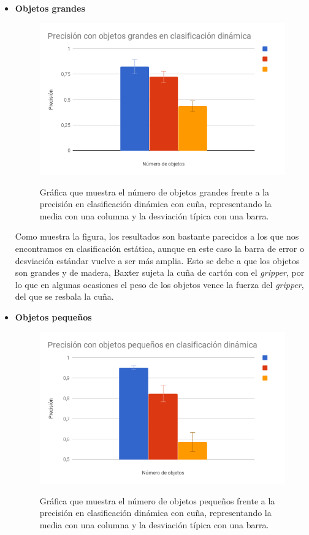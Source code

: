 \begin{itemize}
	\item \textbf{Objetos grandes}

	\begin{figure}[H]
		\centering %
		\label{cd:dg}
		\includegraphics[scale=0.55]{imagenes/errbar_dg.png}
		\caption{Gráfica que muestra el número de objetos grandes frente a la precisión en clasificación dinámica con cuña, representando la media con una columna y la desviación típica con una barra.}
	\end{figure}

	\noindent Como muestra la figura, los resultados son bastante parecidos a los que nos encontramos en clasificación estática, aunque en este caso la barra de error o desviación estándar vuelve a ser más amplia. Esto se debe a que los objetos son grandes y de madera, Baxter sujeta la cuña de cartón con el \textit{gripper}, por lo que en algunas ocasiones el peso de los objetos vence la fuerza del \textit{gripper}, del que se resbala la cuña.\\

	\item \textbf{Objetos pequeños}
	
	\begin{figure}[H]
		\centering %
		\label{cd:dp}
		\includegraphics[scale=0.55]{imagenes/errbar_dp.png}
		\caption{Gráfica que muestra el número de objetos pequeños frente a la precisión en clasificación dinámica con cuña, representando la media con una columna y la desviación típica con una barra.}
	\end{figure}
	

\end{itemize}
